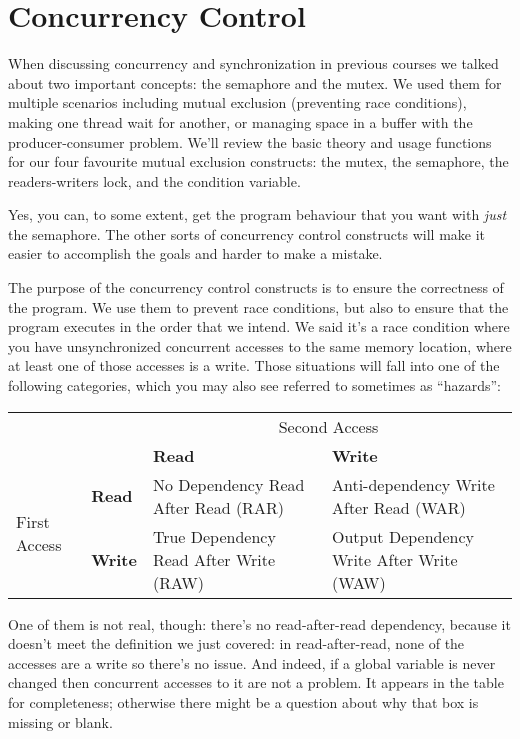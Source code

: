 




\section*{Concurrency Control}

When discussing concurrency and synchronization in previous courses we talked about two important concepts: the semaphore and the mutex. We used them for multiple scenarios including mutual exclusion (preventing race conditions), making one thread wait for another, or managing space in a buffer with the producer-consumer problem. We'll review the basic theory and usage functions for our four favourite mutual exclusion constructs: the mutex, the semaphore, the readers-writers lock, and the condition variable.

Yes, you can, to some extent, get the program behaviour that you want with \textit{just} the semaphore. The other sorts of concurrency control constructs will make it easier to accomplish the goals and harder to make a mistake.

The purpose of the concurrency control constructs is to ensure the correctness of the program. We use them to prevent race conditions, but also to ensure that the program executes in the order that we intend. We said it's a race condition where you have unsynchronized concurrent accesses to the same memory location, where at least one of those accesses is a write. Those situations will fall into one of the following categories, which you may also see referred to sometimes as ``hazards'':

\begin{tabular}{ll|l|l}
& & \multicolumn{2}{c}{Second Access} \\ 
&  & \bf Read & \bf Write \\ \hline
\multirow{2}{*}{First Access} & \bf Read & No Dependency Read After Read (RAR)  & Anti-dependency Write After Read (WAR) \\[0.5em]
& \bf Write & True Dependency Read After Write (RAW) & Output Dependency Write After Write (WAW) \\
\end{tabular}

One of them is not real, though: there's no read-after-read dependency, because it doesn't meet the definition we just covered: in read-after-read, none of the accesses are a write so there's no issue. And indeed, if a global variable is never changed then concurrent accesses to it are not a problem. It appears in the table for completeness; otherwise there might be a question about why that box is missing or blank.

